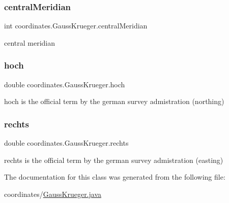 \subsubsection{\texorpdfstring{central\+Meridian}{centralMeridian}}
{\footnotesize\ttfamily int coordinates.\+Gauss\+Krueger.\+central\+Meridian\hspace{0.3cm}{\ttfamily [private]}}

central meridian \mbox{\label{classcoordinates_1_1_gauss_krueger_ad0effac6a487835234850d6dc8805843}} 
\subsubsection{\texorpdfstring{hoch}{hoch}}
{\footnotesize\ttfamily double coordinates.\+Gauss\+Krueger.\+hoch\hspace{0.3cm}{\ttfamily [private]}}

\textquotesingle{}hoch\textquotesingle{} is the official term by the german survey admistration (\textquotesingle{}northing\textquotesingle{}) \mbox{\label{classcoordinates_1_1_gauss_krueger_a7b3a7878b5c0e9af6afee712997630b7}} 
\subsubsection{\texorpdfstring{rechts}{rechts}}
{\footnotesize\ttfamily double coordinates.\+Gauss\+Krueger.\+rechts\hspace{0.3cm}{\ttfamily [private]}}

\textquotesingle{}rechts\textquotesingle{} is the official term by the german survey admistration (\textquotesingle{}easting\textquotesingle{}) 

The documentation for this class was generated from the following file\+:\begin{DoxyCompactItemize}
\item 
coordinates/\hyperlink{_gauss_krueger_8java}{Gauss\+Krueger.\+java}\end{DoxyCompactItemize}
